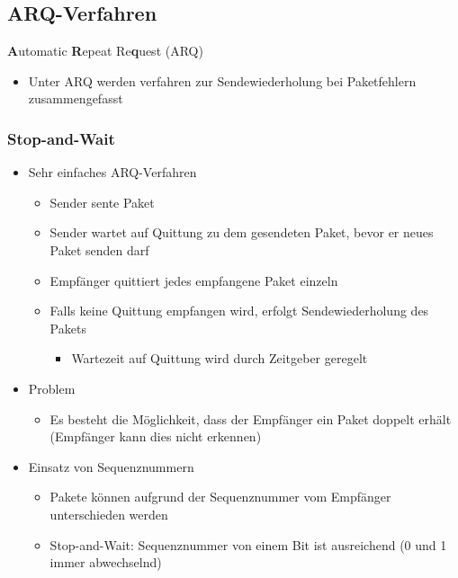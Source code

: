   \subsection{ARQ-Verfahren}
    \textbf{A}utomatic \textbf{R}epeat Re\textbf{q}uest (ARQ)
    \begin{itemize}
      \item Unter ARQ werden verfahren zur Sendewiederholung bei Paketfehlern zusammengefasst
    \end{itemize}
    \subsubsection{Stop-and-Wait}
      \begin{itemize}
        \item Sehr einfaches ARQ-Verfahren
          \begin{itemize}
            \item Sender sente Paket
            \item Sender wartet auf Quittung zu dem gesendeten Paket, bevor er neues Paket senden darf
            \item Empfänger quittiert jedes empfangene Paket einzeln
            \item Falls keine Quittung empfangen wird, erfolgt Sendewiederholung des Pakets
              \begin{itemize}
                \item Wartezeit auf Quittung wird durch Zeitgeber geregelt
              \end{itemize}
          \end{itemize}
        \item Problem
          \begin{itemize}
            \item Es besteht die Möglichkeit, dass der Empfänger ein Paket doppelt erhält (Empfänger kann
              dies nicht erkennen)
          \end{itemize}
        \item Einsatz von Sequenznummern
          \begin{itemize}
            \item Pakete können aufgrund der Sequenznummer vom Empfänger unterschieden werden
            \item Stop-and-Wait: Sequenznummer von einem Bit ist ausreichend (0 und 1 immer abwechselnd)
          \end{itemize}
      \end{itemize}
